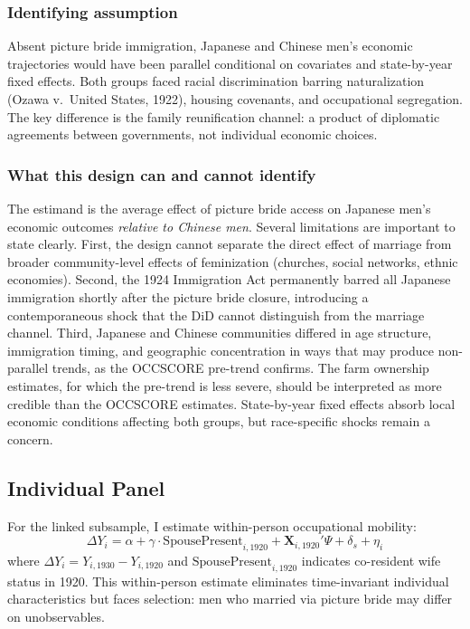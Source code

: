 \documentclass[12pt]{article}
\begin{document}
\subsubsection*{Identifying assumption}  Absent picture bride immigration, Japanese and Chinese men's economic trajectories would have been parallel conditional on covariates and state-by-year fixed effects. Both groups faced racial discrimination barring naturalization (Ozawa v.\ United States, 1922), housing covenants, and occupational segregation. The key difference is the family reunification channel: a product of diplomatic agreements between governments, not individual economic choices.

\subsubsection*{What this design can and cannot identify}  The estimand is the average effect of picture bride access on Japanese men's economic outcomes \textit{relative to Chinese men}. Several limitations are important to state clearly. First, the design cannot separate the direct effect of marriage from broader community-level effects of feminization (churches, social networks, ethnic economies). Second, the 1924 Immigration Act permanently barred all Japanese immigration shortly after the picture bride closure, introducing a contemporaneous shock that the DiD cannot distinguish from the marriage channel. Third, Japanese and Chinese communities differed in age structure, immigration timing, and geographic concentration in ways that may produce non-parallel trends, as the OCCSCORE pre-trend confirms. The farm ownership estimates, for which the pre-trend is less severe, should be interpreted as more credible than the OCCSCORE estimates. State-by-year fixed effects absorb local economic conditions affecting both groups, but race-specific shocks remain a concern.

\subsection{Individual Panel}

For the linked subsample, I estimate within-person occupational mobility:
\begin{equation}
\Delta Y_{i} = \alpha + \gamma \cdot \text{SpousePresent}_{i,1920} + \mathbf{X}_{i,1920}'\Psi + \delta_s + \eta_i
\label{eq:panel}
\end{equation}
where $\Delta Y_i = Y_{i,1930} - Y_{i,1920}$ and $\text{SpousePresent}_{i,1920}$ indicates co-resident wife status in 1920. This within-person estimate eliminates time-invariant individual characteristics but faces selection: men who married via picture bride may differ on unobservables.
\end{document}

